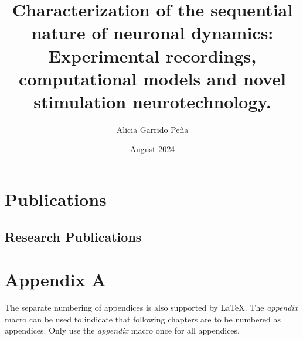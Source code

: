 \documentclass[11pt,a4paper,twoside]{book} %
\title{Characterization of the sequential nature of neuronal dynamics: Experimental recordings, computational models and novel stimulation neurotechnology.}
\author{Alicia Garrido Peña}
\date{August 2024}
\numberwithin{equation}{section}
\begin{document}
\maketitle

% 
% 
% 
\newpage
\clearpage
\newpage





\tableofcontents
\listoftables
\listoffigures
%

\newpage



\resetpagenumbering


%
%
%
%
%
%


\printbibliography


\begin{appendix}
\chapter{Publications}
 \section{Research Publications}

\nocite{*}

 \printbibliography[heading={subbibliography},title={Journal Publications},type=article, keyword={AGP},resetnumbers=true]

\printbibliography[heading={subbibliography},title={Conference Proceedings},type=inproceedings,keyword={AGP},resetnumbers=true]


\chapter{Appendix A}
The separate numbering of appendices is also supported by LaTeX. The \textit{appendix} macro can be used to indicate that following chapters are to be numbered as appendices. Only use the \textit{appendix} macro once for all appendices.


% 


\end{appendix}
\end{document}
